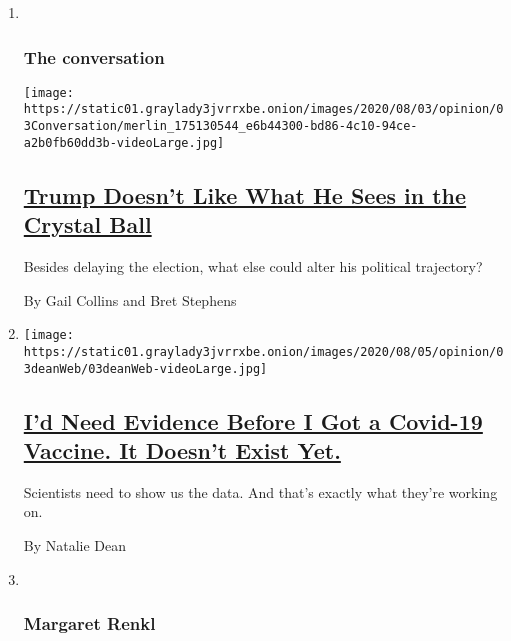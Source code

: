 \begin{enumerate}
\def\labelenumi{\arabic{enumi}.}
\item ~
  \hypertarget{the-conversation}{%
  \subsubsection{The conversation}\label{the-conversation}}

  \texttt{[image: https://static01.graylady3jvrrxbe.onion/images/2020/08/03/opinion/03Conversation/merlin\_175130544\_e6b44300-bd86-4c10-94ce-a2b0fb60dd3b-videoLarge.jpg]}

  \hypertarget{trump-doesnt-like-what-he-sees-in-the-crystal-ball}{%
  \subsection{\texorpdfstring{\href{/2020/08/03/opinion/trump-biden-2020.html}{Trump
  Doesn't Like What He Sees in the Crystal
  Ball}}{Trump Doesn't Like What He Sees in the Crystal Ball}}\label{trump-doesnt-like-what-he-sees-in-the-crystal-ball}}

  Besides delaying the election, what else could alter his political
  trajectory?

  By Gail Collins and Bret Stephens
\item
  \texttt{[image: https://static01.graylady3jvrrxbe.onion/images/2020/08/05/opinion/03deanWeb/03deanWeb-videoLarge.jpg]}

  \hypertarget{id-need-evidence-before-i-got-a-covid-19-vaccine-it-doesnt-exist-yet}{%
  \subsection{\texorpdfstring{\href{/2020/08/03/opinion/coronavirus-vaccine-efficacy-trials.html}{I'd
  Need Evidence Before I Got a Covid-19 Vaccine. It Doesn't Exist
  Yet.}}{I'd Need Evidence Before I Got a Covid-19 Vaccine. It Doesn't Exist Yet.}}\label{id-need-evidence-before-i-got-a-covid-19-vaccine-it-doesnt-exist-yet}}

  Scientists need to show us the data. And that's exactly what they're
  working on.

  By Natalie Dean
\item ~
  \hypertarget{margaret-renkl}{%
  \subsubsection{Margaret Renkl}\label{margaret-renkl}}


\end{enumerate}
